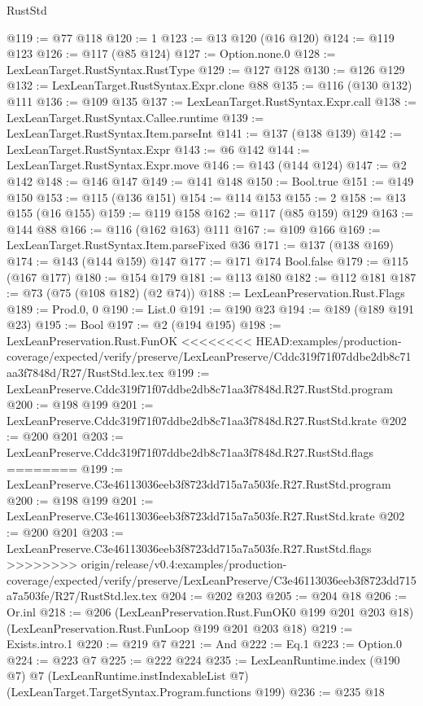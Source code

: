 \begin{lexlean}{RustStd}
\begin{coremodule}
{\begin{coremodule}
{{{{{@119 := @77 @118
@120 := 1
@123 := @13 @120 (@16 @120)
@124 := @119 @123
@126 := @117 (@85 @124)
@127 := Option.none.{0}
@128 := LexLeanTarget.RustSyntax.RustType
@129 := @127 @128
@130 := @126 @129
@132 := LexLeanTarget.RustSyntax.Expr.clone @88
@135 := @116 (@130 @132) @111
@136 := @109 @135
@137 := LexLeanTarget.RustSyntax.Expr.call
@138 := LexLeanTarget.RustSyntax.Callee.runtime
@139 := LexLeanTarget.RustSyntax.Item.parseInt
@141 := @137 (@138 @139)
@142 := LexLeanTarget.RustSyntax.Expr
@143 := @6 @142
@144 := LexLeanTarget.RustSyntax.Expr.move
@146 := @143 (@144 @124)
@147 := @2 @142
@148 := @146 @147
@149 := @141 @148
@150 := Bool.true
@151 := @149 @150
@153 := @115 (@136 @151)
@154 := @114 @153
@155 := 2
@158 := @13 @155 (@16 @155)
@159 := @119 @158
@162 := @117 (@85 @159) @129
@163 := @144 @88
@166 := @116 (@162 @163) @111
@167 := @109 @166
@169 := LexLeanTarget.RustSyntax.Item.parseFixed @36
@171 := @137 (@138 @169)
@174 := @143 (@144 @159) @147
@177 := @171 @174 Bool.false
@179 := @115 (@167 @177)
@180 := @154 @179
@181 := @113 @180
@182 := @112 @181
@187 := @73 (@75 (@108 @182) (@2 @74))
@188 := LexLeanPreservation.Rust.Flags
@189 := Prod.{0, 0}
@190 := List.{0}
@191 := @190 @23
@194 := @189 (@189 @191 @23)
@195 := Bool
@197 := @2 (@194 @195)
@198 := LexLeanPreservation.Rust.FunOK
<<<<<<<< HEAD:examples/production-coverage/expected/verify/preserve/LexLeanPreserve/Cddc319f71f07ddbe2db8c71aa3f7848d/R27/RustStd.lex.tex
@199 := LexLeanPreserve.Cddc319f71f07ddbe2db8c71aa3f7848d.R27.RustStd.program
@200 := @198 @199
@201 := LexLeanPreserve.Cddc319f71f07ddbe2db8c71aa3f7848d.R27.RustStd.krate
@202 := @200 @201
@203 := LexLeanPreserve.Cddc319f71f07ddbe2db8c71aa3f7848d.R27.RustStd.flags
========
@199 := LexLeanPreserve.C3e46113036eeb3f8723dd715a7a503fe.R27.RustStd.program
@200 := @198 @199
@201 := LexLeanPreserve.C3e46113036eeb3f8723dd715a7a503fe.R27.RustStd.krate
@202 := @200 @201
@203 := LexLeanPreserve.C3e46113036eeb3f8723dd715a7a503fe.R27.RustStd.flags
>>>>>>>> origin/release/v0.4:examples/production-coverage/expected/verify/preserve/LexLeanPreserve/C3e46113036eeb3f8723dd715a7a503fe/R27/RustStd.lex.tex
@204 := @202 @203
@205 := @204 @18
@206 := Or.inl
@218 := @206
    (LexLeanPreservation.Rust.FunOK0 @199 @201 @203 @18)
    (LexLeanPreservation.Rust.FunLoop @199 @201 @203 @18)
@219 := Exists.intro.{1}
@220 := @219 @7
@221 := And
@222 := Eq.{1}
@223 := Option.{0}
@224 := @223 @7
@225 := @222 @224
@235 := LexLeanRuntime.index
    (@190 @7)
    @7
    (LexLeanRuntime.instIndexableList @7)
    (LexLeanTarget.TargetSyntax.Program.functions @199)
@236 := @235 @18
}}}}}
\end{coremodule}}
\end{coremodule}
\end{lexlean}

